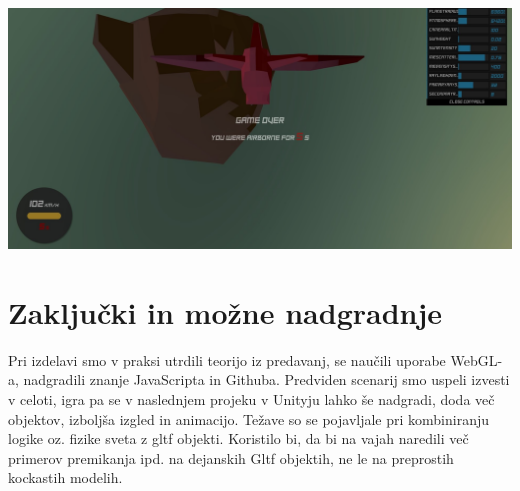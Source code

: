 \documentclass[a4paper]{article}
\begin{document}
\begin{center}
     \includegraphics[width=\columnwidth]{game over.jpg}
\end{center}

\section{Zaključki in možne nadgradnje} %
Pri izdelavi smo v praksi utrdili teorijo iz predavanj, se naučili uporabe WebGL-a, nadgradili znanje JavaScripta in Githuba. Predviden scenarij smo uspeli izvesti v celoti, igra pa se v naslednjem projeku v Unityju lahko še nadgradi, doda več objektov, izboljša izgled in animacijo. Težave so se pojavljale pri kombiniranju logike oz. fizike sveta z gltf objekti. Koristilo bi, da bi na vajah naredili več primerov premikanja ipd. na dejanskih Gltf objektih, ne le na preprostih kockastih modelih.

\small

%
\end{document}
